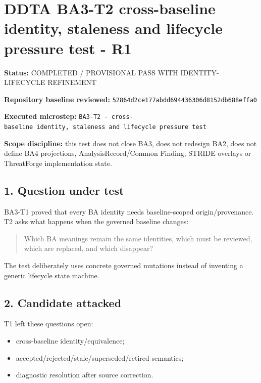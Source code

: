 \documentclass[11pt,a4paper]{article}
\providecommand{\tightlist}{\setlength{\itemsep}{0pt}\setlength{\parskip}{0pt}}\setlength{\emergencystretch}{4em}\hbadness=10000\hfuzz=20pt\sloppy
\begin{document}
\section{DDTA BA3-T2 cross-baseline identity, staleness and lifecycle
pressure test -
R1}\label{ddta-ba3-t2-cross-baseline-identity-staleness-and-lifecycle-pressure-test---r1}

\textbf{Status:} COMPLETED / PROVISIONAL PASS WITH IDENTITY-LIFECYCLE
REFINEMENT

\textbf{Repository baseline reviewed:}
\texttt{52864d2ce177abdd694436306d8152db688effa0}

\textbf{Executed microstep:}
\texttt{BA3-T2\ -\ cross-baseline\ identity,\ staleness\ and\ lifecycle\ pressure\ test}

\textbf{Scope discipline:} this test does not close BA3, does not
redesign BA2, does not define BA4 projections, AnalysisRecord/Common
Finding, STRIDE overlays or ThreatForge implementation state.

\subsection{1. Question under test}\label{question-under-test}

BA3-T1 proved that every BA identity needs baseline-scoped
origin/provenance. T2 asks what happens when the governed baseline
changes:

\begin{quote}
Which BA meanings remain the same identities, which must be reviewed,
which are replaced, and which disappear?
\end{quote}

The test deliberately uses concrete governed mutations instead of
inventing a generic lifecycle state machine.

\subsection{2. Candidate attacked}\label{candidate-attacked}

T1 left these questions open:

\begin{itemize}
\tightlist
\item
  cross-baseline identity/equivalence;
\item
  accepted/rejected/stale/superseded/retired semantics;
\item
  diagnostic resolution after source correction.
\end{itemize}
\end{document}
